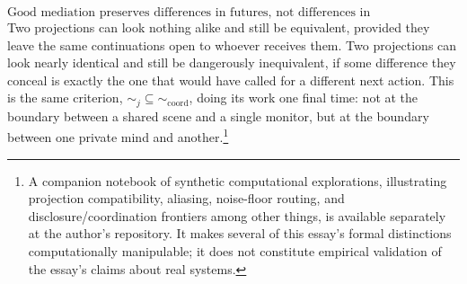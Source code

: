 \documentclass[12pt]{article}
\begin{document}
\[
\boxed{\text{Good mediation preserves differences in futures, not differences in representations.}}
\]
Two projections can look nothing alike and still be equivalent, provided they leave the same continuations open to whoever receives them. Two projections can look nearly identical and still be dangerously inequivalent, if some difference they conceal is exactly the one that would have called for a different next action. This is the same criterion, $\sim_j \subseteq \sim_{\mathrm{coord}}$, doing its work one final time: not at the boundary between a shared scene and a single monitor, but at the boundary between one private mind and another.\footnote{A companion notebook of synthetic computational explorations, illustrating projection compatibility, aliasing, noise-floor routing, and disclosure/coordination frontiers among other things, is available separately at the author's repository. It makes several of this essay's formal distinctions computationally manipulable; it does not constitute empirical validation of the essay's claims about real systems.}
\end{document}
